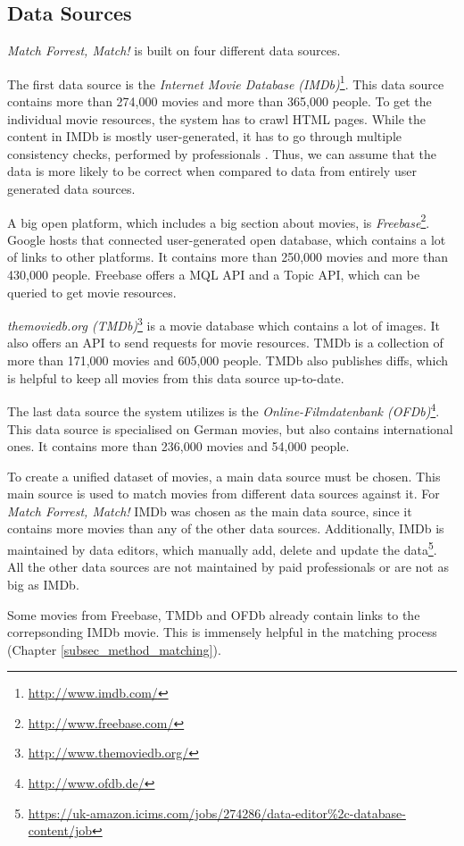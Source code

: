 \subsection{Data Sources}
\label{subsec_method_datasources}

\emph{Match Forrest, Match!} is built on four different data sources.

The first data source is the \textit{Internet Movie Database (IMDb)}\footnote{\url{http://www.imdb.com/}}.
This data source contains more than 274,000 movies and more than 365,000 people.
To get the individual movie resources, the system has to crawl HTML pages.
While the content in IMDb is mostly user-generated, it has to go through multiple consistency checks, performed by professionals \cite{IMDb_DataCreation}.
Thus, we can assume that the data is more likely to be correct when compared to data from entirely user generated data sources.

A big open platform, which includes a big section about movies, is \textit{Freebase}\footnote{\url{http://www.freebase.com/}}.
Google hosts that connected user-generated open database, which contains a lot of links to other platforms.
It contains more than 250,000 movies and more than 430,000 people.
Freebase offers a MQL API and a Topic API, which can be queried to get movie resources.

\textit{themoviedb.org (TMDb)}\footnote{\url{http://www.themoviedb.org/}} is a movie database which contains a lot of images.
It also offers an API to send requests for movie resources.
TMDb is a collection of more than 171,000 movies and 605,000 people.
TMDb also publishes diffs, which is helpful to keep all movies from this data source up-to-date.

The last data source the system utilizes is the \textit{Online-Filmdatenbank (OFDb)}\footnote{\url{http://www.ofdb.de/}}.
This data source is specialised on German movies, but also contains international ones.
It contains more than 236,000 movies and 54,000 people.

To create a unified dataset of movies, a main data source must be chosen.
This main source is used to match movies from different data sources against it.
For \emph{Match Forrest, Match!} IMDb was chosen as the main data source, since it contains more movies than any of the other data sources.
Additionally, IMDb is maintained by data editors, which manually add, delete and update the data\footnote{\url{https://uk-amazon.icims.com/jobs/274286/data-editor\%2c-database-content/job}}.
All the other data sources are not maintained by paid professionals or are not as big as IMDb.

Some movies from Freebase, TMDb and OFDb already contain links to the correpsonding IMDb movie.
This is immensely helpful in the matching process (Chapter \ref{subsec_method_matching}).